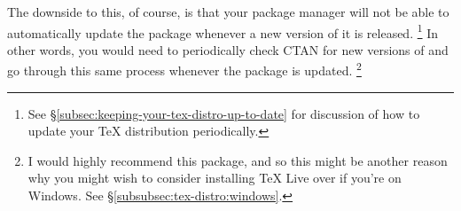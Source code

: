 The downside to this, of course, is that your package manager will not be able to automatically update the  package whenever a new version of it is released.%
\footnote{%
See \S\ref{subsec:keeping-your-tex-distro-up-to-date} for discussion of how to update your \TeX{} distribution periodically.
}
In other words, you would need to periodically check CTAN for new versions of  and go through this same process whenever the package is updated.%
\footnote{%
I would highly recommend this package, and so this might be another reason why you might wish to consider installing TeX Live over  if you're on Windows.
See \S\ref{subsubsec:tex-distro:windows}.%
}